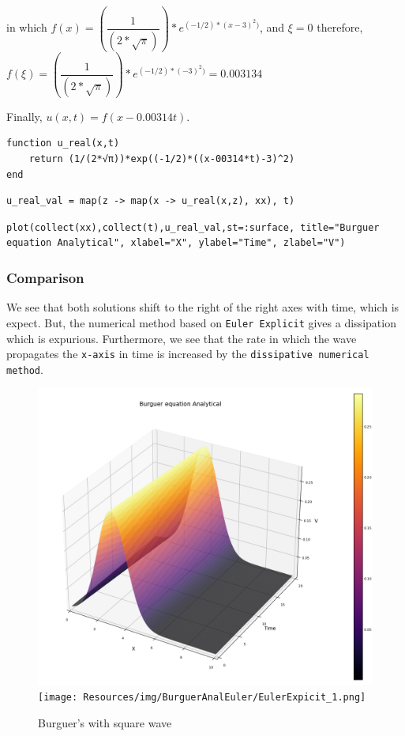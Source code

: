 \documentclass[11pt]{article}
\begin{document}
in which \(f(x) = (\dfrac{1}{(2*\sqrt{\pi})})*e^{(-1/2)*(x-3)^2)}\), and \(\xi = 0\)
therefore, \(f(\xi)= (\dfrac{1}{(2*\sqrt{\pi})})*e^{(-1/2)*(-3)^2)}=0.003134\)

Finally, \(u(x,t)=f(x-0.00314t)\).

\begin{verbatim}
function u_real(x,t)
    return (1/(2*√π))*exp((-1/2)*((x-00314*t)-3)^2)
end
\end{verbatim}
\begin{verbatim}
u_real_val = map(z -> map(x -> u_real(x,z), xx), t)
\end{verbatim}

\begin{verbatim}
plot(collect(xx),collect(t),u_real_val,st=:surface, title="Burguer equation Analytical", xlabel="X", ylabel="Time", zlabel="V")
\end{verbatim}

\subsubsection{Comparison}
\label{sec:orga43a14a}

We see that both solutions shift to the right of the right axes with time, which
is expect. But, the numerical method based on \texttt{Euler Explicit} gives a
dissipation which is expurious. Furthermore, we see that the rate in which the
wave propagates the \texttt{x-axis} in time is increased by the \texttt{dissipative numerical
method}.

\begin{figure}[!htb]
  \centering
  \caption{\label{fig:burguer-square} Burguer's with square wave}
  \includegraphics[width=0.45\linewidth]{Resources/img/BurguerAnalEuler/Burguer_Anal1.png}
  \texttt{[image: Resources/img/BurguerAnalEuler/EulerExpicit\_1.png]}
  \\  %
\end{figure}
\end{document}
